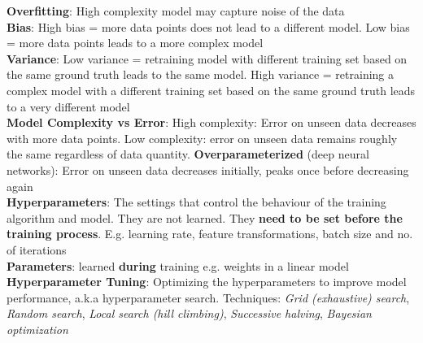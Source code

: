 \documentclass{article}
\begin{document}
\begin{multicols*}{3}
\textbf{Overfitting}: High complexity model may capture noise of the data \\
\textbf{Bias}: High bias = more data points does not lead to a different model. Low bias = more data points leads to a more complex model \\
\textbf{Variance}: Low variance = retraining model with different training set based on the same ground truth leads to the same model. High variance = retraining a complex model with a different training set based on the same ground truth leads to a very different model \\
\textbf{Model Complexity vs Error}: High complexity: Error on unseen data decreases with more data points. Low complexity: error on unseen data remains roughly the same regardless of data quantity. \textbf{Overparameterized} (deep neural networks): Error on unseen data decreases initially, peaks once before decreasing again \\
\textbf{Hyperparameters}: The settings that control the behaviour of the training algorithm and model. They are not learned. They \textbf{need to be set before the training process}. E.g. learning rate, feature transformations, batch size and no. of iterations \\
\textbf{Parameters}: learned \textbf{during} training e.g. weights in a linear model\\
\textbf{Hyperparameter Tuning}: Optimizing the hyperparameters to improve model performance, a.k.a hyperparameter search. Techniques: \textit{Grid (exhaustive) search}, \textit{Random search}, \textit{Local search (hill climbing)}, \textit{Successive halving}, \textit{Bayesian optimization}\\

\end{multicols*}
\end{document}
